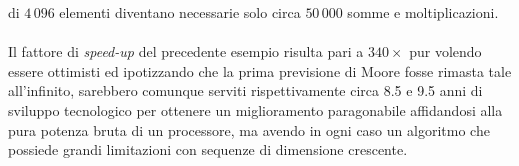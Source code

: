 di $4\,096$ elementi diventano necessarie solo circa $50\,000$ somme e 
moltiplicazioni. %
\\ \\
Il fattore di \emph{speed-up} del precedente esempio risulta pari a $340\times$
 pur volendo essere ottimisti ed 
ipotizzando che la prima previsione di Moore fosse rimasta tale all'infinito, 
sarebbero comunque serviti rispettivamente circa 8.5 e 9.5 anni di sviluppo 
tecnologico per ottenere un miglioramento paragonabile affidandosi alla pura 
potenza bruta di un processore, ma avendo in ogni caso un algoritmo che possiede
grandi limitazioni con sequenze di dimensione crescente. %
